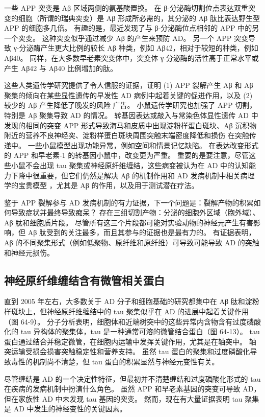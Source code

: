 一些 APP 突变是 Aβ 区域两侧的氨基酸置换。 在 β-分泌酶切割位点表达双重突变的细胞（所谓的瑞典突变）是 Aβ 形成所必需的，其分泌的 Aβ 肽比表达野生型 APP 的细胞多几倍。 有趣的是，最近发现了与 β-分泌酶位点相邻的 APP 中的另一个突变。 这种突变似乎通过减少 Aβ 的产生来预防 AD。 另一个 APP 突变导致 γ-分泌酶产生更大比例的较长 Aβ 种类，例如 Aβ42，相对于较短的种类，例如 Aβ40。 同样，在大多数早老素突变体中，突变体 γ-分泌酶的活性高于正常水平或产生 Aβ42 与 Aβ40 比例增加的肽。

这些人类遗传学研究提供了令人信服的证据，证明 (1) APP 裂解产生 Aβ 和 Aβ 聚集的倾向在某些显性遗传的早发性 AD 病例中起着关键的促进作用，以及 (2) 较少的 Aβ 产生降低了晚发的风险 广告。 小鼠遗传学研究也加强了 APP 切割，特别是 Aβ 聚集导致 AD 的情况。 转基因表达或敲入与常染色体显性遗传 AD 中发现的相同的突变 APP 形式导致海马和皮质中出现淀粉样蛋白斑块、Aβ 沉积物附近的营养不良神经突、淀粉样蛋白斑块周围突触末端密度降低和损伤 在突触传递中。 一些小鼠模型出现功能异常，例如空间和情景记忆缺陷。 在表达改变形式的 APP 和早老素-1 的转基因小鼠中，改变更为严重。 重要的是要注意，尽管这些小鼠不会出现 tau 聚集或神经原纤维缠结，这些病变被认为在 AD 中的认知能力下降中很重要，但它们仍然是解决 Aβ 的机制作用和 AD 发病机制中相关病理学的宝贵模型 ，尤其是 Aβ 的作用，以及用于测试潜在疗法。

鉴于 APP 裂解参与 AD 发病机制的有力证据，下一个问题是：裂解产物的积累如何导致症状并最终导致痴呆？ 存在三组切割产物：分泌的细胞外区域（胞外域）、Aβ 肽和细胞质片段。 尽管所有这三个片段都可能对实验动物的神经元产生有害影响，但 Aβ 肽受到的关注最多，而且其参与的证据也是最有力的。 有证据表明，Aβ 的不同聚集形式（例如低聚物、原纤维和原纤维）可导致可能导致 AD 的突触和神经元损伤。

\subsection{神经原纤维缠结含有微管相关蛋白}
直到 2005 年左右，大多数关于 AD 分子和细胞基础的研究都集中在 Aβ 肽和淀粉样斑块上，但神经原纤维缠结中的 tau 聚集似乎在 AD 的进展中起着关键作用（图 64-9）。 分子分析表明，细胞体和近端树突中的这些异常内含物含有过度磷酸化的 tau 异构体的聚集体，tau 是一种通常可溶的微管结合蛋白（图 64-13）。 tau 蛋白通过结合并稳定微管，在细胞内运输中发挥关键作用，尤其是在轴突中。 轴突运输受损会损害突触稳定性和营养支持。 虽然 tau 蛋白的聚集和过度磷酸化导致毒性的机制尚不清楚，但 tau 蛋白的积累显然与神经元变性有关。

尽管缠结是 AD 的一个决定性特征，但最初并不清楚缠结和过度磷酸化形式的 tau 在疾病的发病机制中扮演什么角色。 虽然 APP 和早老素基因的突变可导致 AD，但在家族性 AD 中未发现 tau 基因的突变。 然而，现在有大量证据表明 tau 聚集是 AD 中发生的神经变性的关键因素。

